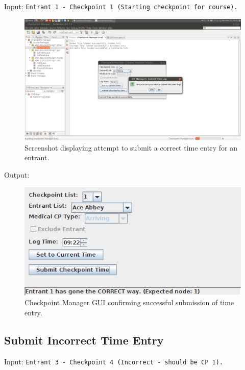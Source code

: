 \documentclass[a4paper, 10pt]{article}
\begin{document}
Input: \verb+Entrant 1 - Checkpoint 1 (Starting checkpoint for course).+ \\
\begin{figure}[ht!]
\centering
\includegraphics[scale=0.25]{cm-submit.png}
\caption{Screenshot displaying attempt to submit a correct time entry for an entrant.}
\end{figure}

Output:
\begin{figure}[ht!]
\centering
\includegraphics[scale=0.5]{cm-submitsuccess.png}
\caption{Checkpoint Manager GUI confirming successful submission of time entry.}
\end{figure}

\subsection{Submit Incorrect Time Entry}

Input: \verb+Entrant 3 - Checkpoint 4 (Incorrect - should be CP 1).+ \\
\end{document}
